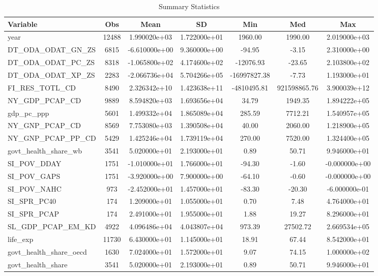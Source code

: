 \begin{table}
\centering
\caption{Summary Statistics}
\label{Sum_Stats}
\begin{tabular}{lcccccc}
\toprule
              Variable &   Obs &          Mean &           SD &          Min &          Med &           Max \\
\midrule
year & 12488 & 1.990020e+03 & 1.722000e+01 & 1960.00 & 1990.00 & 2.019000e+03 \\
DT\_ODA\_ODAT\_GN\_ZS & 6815 & -6.610000e+00 & 9.360000e+00 & -94.95 & -3.15 & 2.310000e+00 \\
DT\_ODA\_ODAT\_PC\_ZS & 8318 & -1.065800e+02 & 4.174600e+02 & -12076.93 & -23.65 & 2.103800e+02 \\
DT\_ODA\_ODAT\_XP\_ZS & 2283 & -2.066736e+04 & 5.704266e+05 & -16997827.38 & -7.73 & 1.193000e+01 \\
FI\_RES\_TOTL\_CD & 8490 & 2.326342e+10 & 1.423638e+11 & -4810495.81 & 921598865.76 & 3.900039e+12 \\
NY\_GDP\_PCAP\_CD & 9889 & 8.594820e+03 & 1.693656e+04 & 34.79 & 1949.35 & 1.894222e+05 \\
gdp\_pc\_ppp & 5601 & 1.499332e+04 & 1.865089e+04 & 285.59 & 7712.21 & 1.540957e+05 \\
NY\_GNP\_PCAP\_CD & 8569 & 7.753080e+03 & 1.390508e+04 & 40.00 & 2060.00 & 1.218900e+05 \\
NY\_GNP\_PCAP\_PP\_CD & 5429 & 1.425246e+04 & 1.739119e+04 & 270.00 & 7520.00 & 1.324400e+05 \\
govt\_health\_share\_wb & 3541 & 5.020000e+01 & 2.193000e+01 & 0.89 & 50.71 & 9.946000e+01 \\
SI\_POV\_DDAY & 1751 & -1.010000e+01 & 1.766000e+01 & -94.30 & -1.60 & -0.000000e+00 \\
SI\_POV\_GAPS & 1751 & -3.920000e+00 & 7.900000e+00 & -64.10 & -0.60 & -0.000000e+00 \\
SI\_POV\_NAHC & 973 & -2.452000e+01 & 1.457000e+01 & -83.30 & -20.30 & -6.000000e-01 \\
SI\_SPR\_PC40 & 174 & 1.209000e+01 & 1.055000e+01 & 0.70 & 7.48 & 4.764000e+01 \\
SI\_SPR\_PCAP & 174 & 2.491000e+01 & 1.955000e+01 & 1.88 & 19.27 & 8.296000e+01 \\
SL\_GDP\_PCAP\_EM\_KD & 4922 & 4.096486e+04 & 4.043807e+04 & 973.39 & 27502.72 & 2.669534e+05 \\
life\_exp & 11730 & 6.430000e+01 & 1.145000e+01 & 18.91 & 67.44 & 8.542000e+01 \\
govt\_health\_share\_oecd & 1630 & 7.024000e+01 & 1.572000e+01 & 9.07 & 74.15 & 1.000000e+02 \\
govt\_health\_share & 3541 & 5.020000e+01 & 2.193000e+01 & 0.89 & 50.71 & 9.946000e+01 \\
\bottomrule
\end{tabular}
\end{table}
